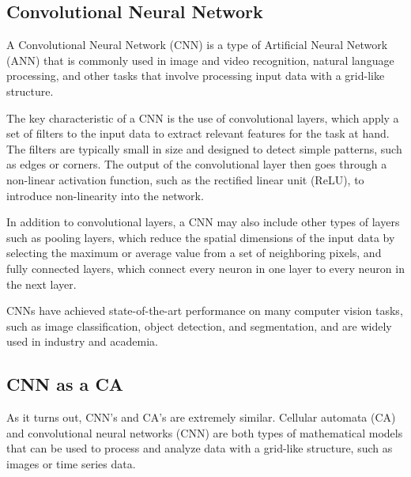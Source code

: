 \subsection{Convolutional Neural Network}

A Convolutional Neural Network (CNN) is a type of Artificial Neural Network (ANN) that is commonly used in image and video recognition, natural language processing, and other tasks that involve processing input data with a grid-like structure.

The key characteristic of a CNN is the use of convolutional layers, which apply a set of filters to the input data to extract relevant features for the task at hand. The filters are typically small in size and designed to detect simple patterns, such as edges or corners. The output of the convolutional layer then goes through a non-linear activation function, such as the rectified linear unit (ReLU), to introduce non-linearity into the network.

In addition to convolutional layers, a CNN may also include other types of layers such as pooling layers, which reduce the spatial dimensions of the input data by selecting the maximum or average value from a set of neighboring pixels, and fully connected layers, which connect every neuron in one layer to every neuron in the next layer.

CNNs have achieved state-of-the-art performance on many computer vision tasks, such as image classification, object detection, and segmentation, and are widely used in industry and academia.

\subsection{CNN as a CA}
As it turns out, CNN's and CA's are extremely similar. Cellular automata (CA) and convolutional neural networks (CNN) are both types of mathematical models that can be used to process and analyze data with a grid-like structure, such as images or time series data. \cite{PhysRevE.100.032402}

